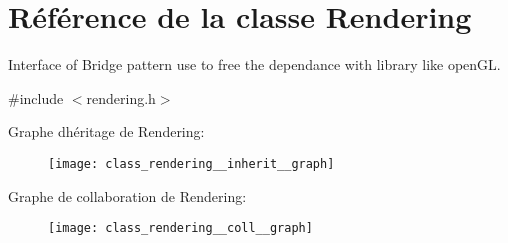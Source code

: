\hypertarget{class_rendering}{}\section{Référence de la classe Rendering}
\label{class_rendering}


Interface of Bridge pattern use to free the dependance with library like open\+GL.  




{\ttfamily \#include $<$rendering.\+h$>$}



Graphe d\textquotesingle{}héritage de Rendering\+:\nopagebreak
\begin{figure}[H]
\begin{center}
\leavevmode
\texttt{[image: class\_rendering\_\_inherit\_\_graph]}
\end{center}
\end{figure}


Graphe de collaboration de Rendering\+:\nopagebreak
\begin{figure}[H]
\begin{center}
\leavevmode
\texttt{[image: class\_rendering\_\_coll\_\_graph]}
\end{center}
\end{figure}
